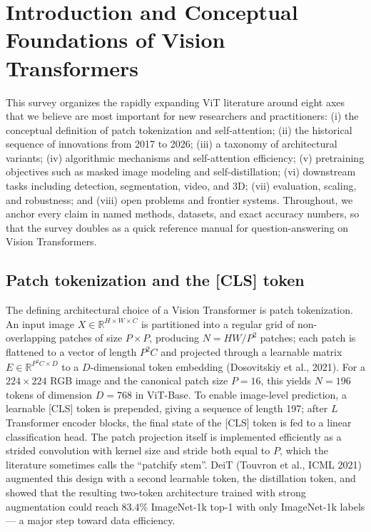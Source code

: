 \section{Introduction and Conceptual Foundations of Vision Transformers}\label{introduction-and-conceptual-foundations-of-vision-transformers}

This survey organizes the rapidly expanding ViT literature around eight axes that we believe are most important for new researchers and practitioners: (i) the conceptual definition of patch tokenization and self-attention; (ii) the historical sequence of innovations from 2017 to 2026; (iii) a taxonomy of architectural variants; (iv) algorithmic mechanisms and self-attention efficiency; (v) pretraining objectives such as masked image modeling and self-distillation; (vi) downstream tasks including detection, segmentation, video, and 3D; (vii) evaluation, scaling, and robustness; and (viii) open problems and frontier systems. Throughout, we anchor every claim in named methods, datasets, and exact accuracy numbers, so that the survey doubles as a quick reference manual for question-answering on Vision Transformers.

\subsection{Patch tokenization and the {[}CLS{]} token}\label{patch-tokenization-and-the-cls-token}

The defining architectural choice of a Vision Transformer is patch tokenization. An input image \(X \in \mathbb{R}^{H \times W \times C}\) is partitioned into a regular grid of non-overlapping patches of size \(P \times P\), producing \(N = HW/P^2\) patches; each patch is flattened to a vector of length \(P^2 C\) and projected through a learnable matrix \(E \in \mathbb{R}^{P^2 C \times D}\) to a \(D\)-dimensional token embedding (Dosovitskiy et al., 2021). For a \(224 \times 224\) RGB image and the canonical patch size \(P=16\), this yields \(N = 196\) tokens of dimension \(D=768\) in ViT-Base. To enable image-level prediction, a learnable {[}CLS{]} token is prepended, giving a sequence of length 197; after \(L\) Transformer encoder blocks, the final state of the {[}CLS{]} token is fed to a linear classification head. The patch projection itself is implemented efficiently as a strided convolution with kernel size and stride both equal to \(P\), which the literature sometimes calls the ``patchify stem''. DeiT (Touvron et al., ICML 2021) augmented this design with a second learnable token, the distillation token, and showed that the resulting two-token architecture trained with strong augmentation could reach 83.4\% ImageNet-1k top-1 with only ImageNet-1k labels --- a major step toward data efficiency.

